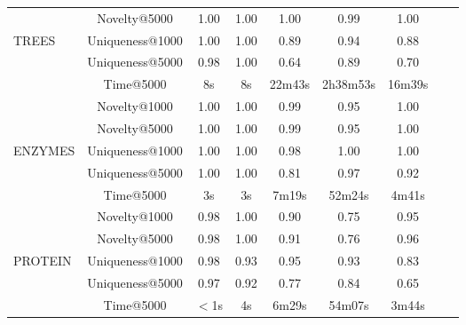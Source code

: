 \begin{table}[h!]
\begin{tabular}{lcccccccc}
          & Novelty@5000              & 1.00 & 1.00 & 1.00   & 0.99     & 1.00\\
          TREES & Uniqueness@1000     & 1.00 & 1.00 & 0.89   & 0.94     & 0.88\\
          & Uniqueness@5000           & 0.98 & 1.00 & 0.64   & 0.89     & 0.70\\
          & Time@5000                 & 8s   & 8s   & 22m43s & 2h38m53s & 16m39s\\
         \midrule
          & Novelty@1000              & 1.00 & 1.00 & 0.99 & 0.95    & 1.00\\
          & Novelty@5000              & 1.00 & 1.00 & 0.99 & 0.95    & 1.00\\
          ENZYMES & Uniqueness@1000   & 1.00 & 1.00 & 0.98 & 1.00    & 1.00\\
          & Uniqueness@5000           & 1.00 & 1.00 & 0.81  & 0.97   & 0.92\\
          & Time@5000                 & 3s   & 3s   & 7m19s & 52m24s & 4m41s\\
        \midrule
          & Novelty@1000              & 0.98  & 1.00 & 0.90  & 0.75   & 0.95\\
          & Novelty@5000              & 0.98  & 1.00 & 0.91  & 0.76   & 0.96\\
          PROTEIN & Uniqueness@1000   & 0.98  & 0.93 & 0.95  & 0.93   & 0.83\\
          & Uniqueness@5000           & 0.97  & 0.92 & 0.77  & 0.84   & 0.65\\
          & Time@5000                 & $<$1s & 4s   & 6m29s & 54m07s & 3m44s\\
          \bottomrule
    \end{tabular}
\end{table}